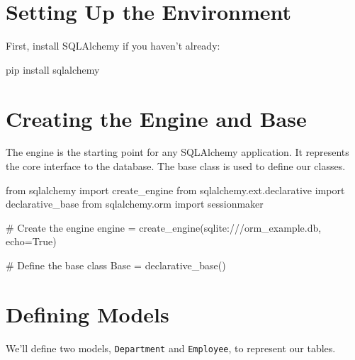 \documentclass[
  letterpaper,
  DIV=11,
  numbers=noendperiod]{scrreprt}
\newenvironment{Shaded}{\begin{snugshade}}{\end{snugshade}}
\newcommand{\CommentTok}[1]{\textcolor[rgb]{0.37,0.37,0.37}{#1}}
\newcommand{\ExtensionTok}[1]{\textcolor[rgb]{0.00,0.23,0.31}{#1}}
\newcommand{\ImportTok}[1]{\textcolor[rgb]{0.00,0.46,0.62}{#1}}
\newcommand{\NormalTok}[1]{\textcolor[rgb]{0.00,0.23,0.31}{#1}}
\newcommand{\OperatorTok}[1]{\textcolor[rgb]{0.37,0.37,0.37}{#1}}
\newcommand{\StringTok}[1]{\textcolor[rgb]{0.13,0.47,0.30}{#1}}
\newcommand{\VariableTok}[1]{\textcolor[rgb]{0.07,0.07,0.07}{#1}}
\begin{document}
\section{Setting Up the Environment}\label{setting-up-the-environment-1}

First, install SQLAlchemy if you haven't already:

\begin{Shaded}
\begin{Highlighting}[]
\ExtensionTok{pip}\NormalTok{ install sqlalchemy}
\end{Highlighting}
\end{Shaded}

\section{Creating the Engine and
Base}\label{creating-the-engine-and-base-1}

The engine is the starting point for any SQLAlchemy application. It
represents the core interface to the database. The base class is used to
define our classes.

\begin{Shaded}
\begin{Highlighting}[]
\ImportTok{from}\NormalTok{ sqlalchemy }\ImportTok{import}\NormalTok{ create\_engine}
\ImportTok{from}\NormalTok{ sqlalchemy.ext.declarative }\ImportTok{import}\NormalTok{ declarative\_base}
\ImportTok{from}\NormalTok{ sqlalchemy.orm }\ImportTok{import}\NormalTok{ sessionmaker}

\CommentTok{\# Create the engine}
\NormalTok{engine }\OperatorTok{=}\NormalTok{ create\_engine(}\StringTok{\textquotesingle{}sqlite:///orm\_example.db\textquotesingle{}}\NormalTok{, echo}\OperatorTok{=}\VariableTok{True}\NormalTok{)}

\CommentTok{\# Define the base class}
\NormalTok{Base }\OperatorTok{=}\NormalTok{ declarative\_base()}
\end{Highlighting}
\end{Shaded}

\section{Defining Models}\label{defining-models-1}

We'll define two models, \texttt{Department} and \texttt{Employee}, to
represent our tables.
\end{document}
